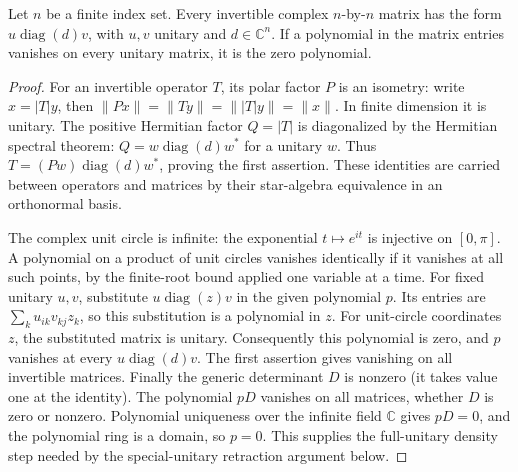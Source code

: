 \begin{lemma}
\label{lem:balanced-full-unitary-density}
\leanok
{}
Let $n$ be a finite index set. Every invertible complex $n$-by-$n$
matrix has the form $u\operatorname{diag}(d)v$, with $u,v$ unitary
and $d\in\mathbb C^n$. If a polynomial in the matrix entries vanishes
on every unitary matrix, it is the zero polynomial.
\end{lemma}
\begin{proof}
For an invertible operator $T$, its polar factor $P$ is an isometry:
write $x=|T|y$, then
$\|Px\|=\|Ty\|=\||T|y\|=\|x\|$. In finite dimension it is unitary.
The positive Hermitian factor $Q=|T|$ is diagonalized by the Hermitian
spectral theorem: $Q=w\operatorname{diag}(d)w^*$ for a unitary $w$.
Thus $T=(Pw)\operatorname{diag}(d)w^*$, proving the first assertion.
These identities are carried between operators and matrices by their
star-algebra equivalence in an orthonormal basis.

The complex unit circle is infinite: the exponential $t\mapsto e^{it}$
is injective on $[0,\pi]$. A polynomial on a product of unit circles
vanishes identically if it vanishes at all such points, by the finite-root
bound applied one variable at a time. For fixed unitary $u,v$, substitute
$u\operatorname{diag}(z)v$ in the given polynomial $p$. Its entries are
$\sum_k u_{ik}v_{kj}z_k$, so this substitution is a polynomial in $z$.
For unit-circle coordinates $z$, the substituted matrix is unitary.
Consequently this polynomial is zero, and $p$ vanishes at every
$u\operatorname{diag}(d)v$. The first assertion gives vanishing on all
invertible matrices. Finally the generic determinant $D$ is nonzero
(it takes value one at the identity). The polynomial $pD$ vanishes on
all matrices, whether $D$ is zero or nonzero. Polynomial uniqueness
over the infinite field $\mathbb C$ gives $pD=0$, and the polynomial
ring is a domain, so $p=0$. This supplies the full-unitary density
step needed by the special-unitary retraction argument below.
\end{proof}

